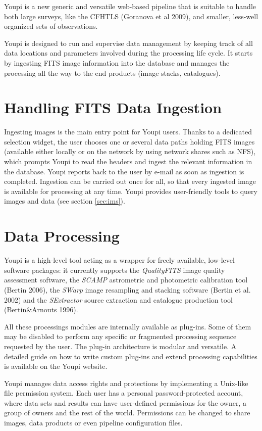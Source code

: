 \documentclass[11pt,twoside]{article}  %
\begin{document}
Youpi is a new generic and versatile web-based pipeline that is suitable to handle both large 
surveys, like the CFHTLS (Goranova et al 2009), and smaller, less-well organized sets of 
observations. 

Youpi is designed to run and supervise data management by keeping track of all data locations 
and parameters involved during the processing life cycle. It starts by ingesting FITS image
information into the database and manages the processing all the way to the end products (image stacks,
catalogues).

\section{Handling FITS Data Ingestion}

Ingesting images is the main entry point for Youpi users. Thanks to a dedicated selection widget,
the user chooses one or several data paths holding FITS images (available either locally or on
the network  by using network shares such as NFS), which prompts Youpi to read the headers and ingest 
the relevant information in the database. Youpi reports back to the user by e-mail as soon as
ingestion is completed. Ingestion can be carried out once for all, so that every ingested image
is available for processing at any time. Youpi provides user-friendly tools to query images and data
(see section \ref{sec:ims}). 

\section{Data Processing}

Youpi is a high-level tool acting as a wrapper for freely available, low-level software packages:
it currently supports the \emph{QualityFITS} image quality assessment software, the \emph{SCAMP}
astrometric and photometric calibration tool (Bertin 2006), the \emph{SWarp} image resampling
and stacking software (Bertin et al. 2002) and the \emph{SExtractor} source extraction and catalogue production tool
(Bertin\&Arnouts 1996).

All these processings modules are internally available as plug-ins. Some of them may be disabled 
to perform any specific or fragmented processing sequence requested by the user. The 
plug-in architecture is modular and versatile. A detailed guide on how to write custom plug-ins and
extend processing capabilities is available on the Youpi website.

Youpi manages data access rights and protections by implementing a Unix-like file permission system. 
Each user has a personal password-protected account, where data sets and results can have 
user-defined permissions for the owner, a group of owners and the rest of the world. Permissions
can be changed to share images, data products or even pipeline configuration files.
\end{document}
